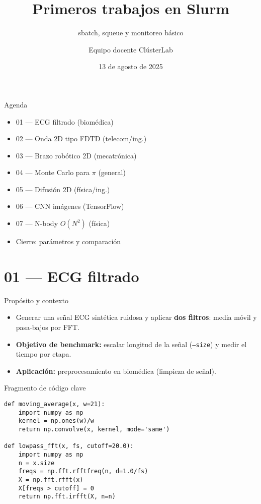 \documentclass[aspectratio=169,professionalfonts]{beamer}
\title[ClústerLab • Día 5]{Primeros trabajos en Slurm}
\subtitle{sbatch, squeue y monitoreo básico}
\author{Equipo docente ClústerLab}
\date{13 de agosto de 2025}
\begin{document}
\begin{frame}[plain]
  \titlepage
\end{frame}

\begin{frame}{Agenda}
\begin{itemize}
  \item 01 — ECG filtrado (biomédica)
  \item 02 — Onda 2D tipo FDTD (telecom/ing.)
  \item 03 — Brazo robótico 2D (mecatrónica)
  \item 04 — Monte Carlo para \(\pi\) (general)
  \item 05 — Difusión 2D (física/ing.)
  \item 06 — CNN imágenes (TensorFlow)
  \item 07 — N-body \(O(N^2)\) (física)
  \item Cierre: parámetros y comparación
\end{itemize}
\end{frame}

\section{01 — ECG filtrado}

\begin{frame}{Propósito y contexto}
\begin{itemize}
  \item Generar una señal ECG sintética ruidosa y aplicar \textbf{dos filtros}:
  media móvil y pasa-bajos por FFT.
  \item \textbf{Objetivo de benchmark:} escalar longitud de la señal (\texttt{--size})
  y medir el tiempo por etapa.
  \item \textbf{Aplicación:} preprocesamiento en biomédica (limpieza de señal).
\end{itemize}
\end{frame}

\begin{frame}[fragile]{Fragmento de código clave}
\begin{verbatim}
def moving_average(x, w=21):
    import numpy as np
    kernel = np.ones(w)/w
    return np.convolve(x, kernel, mode='same')

def lowpass_fft(x, fs, cutoff=20.0):
    import numpy as np
    n = x.size
    freqs = np.fft.rfftfreq(n, d=1.0/fs)
    X = np.fft.rfft(x)
    X[freqs > cutoff] = 0
    return np.fft.irfft(X, n=n)
\end{verbatim}
\end{frame}
\end{document}
